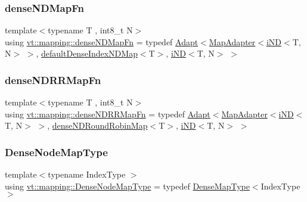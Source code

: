 \subsubsection{\texorpdfstring{dense\+N\+D\+Map\+Fn}{denseNDMapFn}}
{\footnotesize\ttfamily template$<$typename T , int8\+\_\+t N$>$ \\
using \hyperlink{namespacevt_1_1mapping_a02a4066fb2101421d657a9f601cc9977}{vt\+::mapping\+::dense\+N\+D\+Map\+Fn} = typedef \hyperlink{namespacevt_1_1mapping_aafe187035ce8df02f31983e37cdb6a5d}{Adapt}$<$\hyperlink{namespacevt_1_1mapping_a41b113c28bb6430fbcb5be66e08ccf9f}{Map\+Adapter}$<$\hyperlink{namespacevt_1_1mapping_ad53b53dc14e67437c17cefe9c3c70380}{i\+ND}$<$T, N$>$ $>$, \hyperlink{namespacevt_1_1mapping_a39633710d765933d6d91b8bb9818fcc7}{default\+Dense\+Index\+N\+D\+Map}$<$T$>$, \hyperlink{namespacevt_1_1mapping_ad53b53dc14e67437c17cefe9c3c70380}{i\+ND}$<$T, N$>$ $>$}

\mbox{\label{namespacevt_1_1mapping_af7eabd4006a3462a6ae120d52cc638a1}} 
\subsubsection{\texorpdfstring{dense\+N\+D\+R\+R\+Map\+Fn}{denseNDRRMapFn}}
{\footnotesize\ttfamily template$<$typename T , int8\+\_\+t N$>$ \\
using \hyperlink{namespacevt_1_1mapping_af7eabd4006a3462a6ae120d52cc638a1}{vt\+::mapping\+::dense\+N\+D\+R\+R\+Map\+Fn} = typedef \hyperlink{namespacevt_1_1mapping_aafe187035ce8df02f31983e37cdb6a5d}{Adapt}$<$\hyperlink{namespacevt_1_1mapping_a41b113c28bb6430fbcb5be66e08ccf9f}{Map\+Adapter}$<$\hyperlink{namespacevt_1_1mapping_ad53b53dc14e67437c17cefe9c3c70380}{i\+ND}$<$T, N$>$ $>$, \hyperlink{namespacevt_1_1mapping_a270a829564506d7b8de50c9867ff2b76}{dense\+N\+D\+Round\+Robin\+Map}$<$T$>$, \hyperlink{namespacevt_1_1mapping_ad53b53dc14e67437c17cefe9c3c70380}{i\+ND}$<$T, N$>$ $>$}

\mbox{\label{namespacevt_1_1mapping_a224f382367a2c65c3be2a9f91f89ffd5}} 
\subsubsection{\texorpdfstring{Dense\+Node\+Map\+Type}{DenseNodeMapType}}
{\footnotesize\ttfamily template$<$typename Index\+Type $>$ \\
using \hyperlink{namespacevt_1_1mapping_a224f382367a2c65c3be2a9f91f89ffd5}{vt\+::mapping\+::\+Dense\+Node\+Map\+Type} = typedef \hyperlink{namespacevt_1_1mapping_a64f0fc107b569bb6644f1b015c6e7ad8}{Dense\+Map\+Type}$<$Index\+Type$>$}

